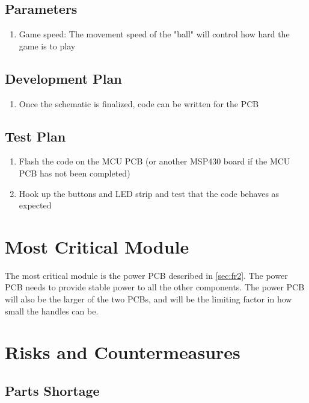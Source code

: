 \documentclass{notes}
\begin{document}
\subsection{Parameters}

\begin{enumerate}
    \item Game speed: The movement speed of the "ball" will control how hard the game is to play
\end{enumerate}

\subsection{Development Plan}

\begin{enumerate}
    \item Once the schematic is finalized, code can be written for the PCB
\end{enumerate}

\subsection{Test Plan}

\begin{enumerate}
    \item Flash the code on the MCU PCB (or another MSP430 board if the MCU PCB has not been completed)
    \item Hook up the buttons and LED strip and test that the code behaves as expected
\end{enumerate}

\section{Most Critical Module}

The most critical module is the power PCB described in \autoref{sec:fr2}.
The power PCB needs to provide stable power to all the other components.
The power PCB will also be the larger of the two PCBs, and will be the limiting factor in how small the handles can be.

\section{Risks and Countermeasures}

\subsection{Parts Shortage}
\end{document}
